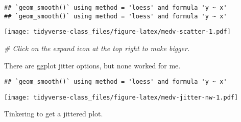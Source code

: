 \documentclass[]{book}
\newenvironment{Shaded}{\begin{snugshade}}{\end{snugshade}}
\newcommand{\KeywordTok}[1]{\textcolor[rgb]{0.13,0.29,0.53}{\textbf{#1}}}
\newcommand{\DataTypeTok}[1]{\textcolor[rgb]{0.13,0.29,0.53}{#1}}
\newcommand{\FloatTok}[1]{\textcolor[rgb]{0.00,0.00,0.81}{#1}}
\newcommand{\StringTok}[1]{\textcolor[rgb]{0.31,0.60,0.02}{#1}}
\newcommand{\CommentTok}[1]{\textcolor[rgb]{0.56,0.35,0.01}{\textit{#1}}}
\newcommand{\OtherTok}[1]{\textcolor[rgb]{0.56,0.35,0.01}{#1}}
\newcommand{\OperatorTok}[1]{\textcolor[rgb]{0.81,0.36,0.00}{\textbf{#1}}}
\newcommand{\NormalTok}[1]{#1}
\begin{document}
\begin{verbatim}
## `geom_smooth()` using method = 'loess' and formula 'y ~ x'
## `geom_smooth()` using method = 'loess' and formula 'y ~ x'
\end{verbatim}

\texttt{[image: tidyverse-class\_files/figure-latex/medv-scatter-1.pdf]}

\begin{Shaded}
\begin{Highlighting}[]
\CommentTok{# Click on the expand icon at the top right to make bigger.}
\end{Highlighting}
\end{Shaded}

There are ggplot jitter options, but none worked for me.

\begin{Shaded}
\end{Shaded}

\begin{verbatim}
## `geom_smooth()` using method = 'loess' and formula 'y ~ x'
\end{verbatim}

\texttt{[image: tidyverse-class\_files/figure-latex/medv-jitter-nw-1.pdf]}

Tinkering to get a jittered plot.
\end{document}
